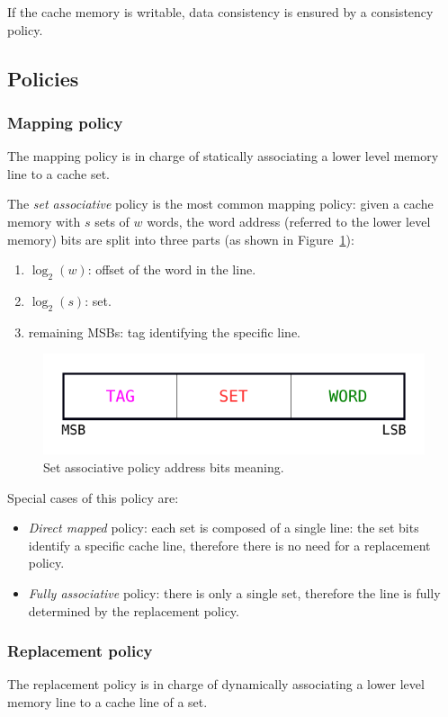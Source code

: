 \documentclass[11pt,a4paper]{memoir}
\begin{document}
If the cache memory is writable, data consistency is ensured by a consistency policy.
\subsection{Policies}
\subsubsection{Mapping policy}
The mapping policy is in charge of statically associating a lower level memory
line to a cache set.

The \emph{set associative} policy is the most common mapping policy: given a
cache memory with $s$ sets of $w$ words, the word address (referred to the lower
level memory) bits are split into three parts (as shown in
Figure~\ref{fig:address_partitioning}):
\begin{enumerate}
	\item $\log_2(w)$: offset of the word in the line.
	\item $\log_2(s)$: set.
	\item remaining MSBs: tag identifying the specific line.
\end{enumerate}

\begin{figure}
	\centering
	\includegraphics[width=.5\textwidth]{address_partitioning}
	\caption{Set associative policy address bits meaning.}
	\label{fig:address_partitioning}
\end{figure}

Special cases of this policy are:
\begin{itemize}
	\item \emph{Direct mapped} policy: each set is composed of a single line:
		the set bits identify a specific cache line, therefore there is
		no need for a replacement policy.
	\item \emph{Fully associative} policy: there is only a single set,
		therefore the line is fully determined by the replacement policy.
\end{itemize}

\subsubsection{Replacement policy}
The replacement policy is in charge of dynamically associating a lower level
memory line to a cache line of a set.
\end{document}
